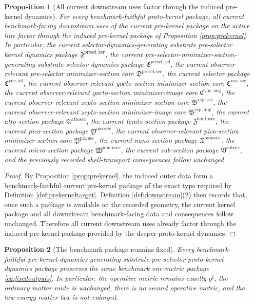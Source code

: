 \documentclass[11pt]{article}
\newcommand{\CompletedMetric}{g^{\sharp}}
\newcommand{\SubSectionPackage}{\mathfrak V^{\mathrm{subsec}}}
\newcommand{\MicroSectionPackage}{\mathfrak W^{\mathrm{microsec}}}
\newcommand{\NanoSectionPackage}{\mathfrak X^{\mathrm{nanosec}}}
\newcommand{\PicoSectionPackage}{\mathfrak Y^{\mathrm{picosec}}}
\newcommand{\PicoMinSectionCore}{\mathfrak Y^{\mathrm{pic,sec}}}
\newcommand{\FemtoSectionPackage}{\mathfrak Z^{\mathrm{femtosec}}}
\newcommand{\AttoSectionPackage}{\mathfrak A^{\mathrm{attosec}}}
\newcommand{\ZeptoImageCore}{\mathfrak B^{\mathrm{zep,img}}}
\newcommand{\ZeptoMinSectionCore}{\mathfrak B^{\mathrm{zep,sec}}}
\newcommand{\YoctoImageCore}{\mathfrak C^{\mathrm{yoc,img}}}
\newcommand{\YoctoMinSectionCore}{\mathfrak C^{\mathrm{yoc,sec}}}
\newcommand{\YoctoSelectorPackage}{\mathfrak C^{\mathrm{yoc,sel}}}
\newcommand{\PreSelectorMinSectionCore}{\mathfrak D^{\mathrm{presel,sec}}}
\newcommand{\PreSectionSelectorPackage}{\mathfrak E^{\mathrm{presel,sel}}}
\newcommand{\KernelPackage}{\mathfrak F^{\mathrm{presel,ker}}}
\newtheorem{proposition}{Proposition}
\begin{document}
\begin{proposition}[All current downstream uses factor through the induced pre-kernel dynamics]
\label{prop:downstream}
For every benchmark-faithful proto-kernel package, all current benchmark-facing downstream uses of the current pre-kernel package on the active line factor through the induced pre-kernel package of Proposition \ref{prop:prekernel}. In particular, the current selector-dynamics-generating substrate pre-selector kernel dynamics package \(\KernelPackage\), the current pre-selector-minimizer-section-generating substrate selector dynamics package \(\PreSectionSelectorPackage\), the current observer-relevant pre-selector minimizer-section core \(\PreSelectorMinSectionCore\), the current selector package \(\YoctoSelectorPackage\), the current observer-relevant yocto-section minimizer-section core \(\YoctoMinSectionCore\), the current observer-relevant yocto-section minimizer-image core \(\YoctoImageCore\), the current observer-relevant zepto-section minimizer-section core \(\ZeptoMinSectionCore\), the current observer-relevant zepto-section minimizer-image core \(\ZeptoImageCore\), the current atto-section package \(\AttoSectionPackage\), the current femto-section package \(\FemtoSectionPackage\), the current pico-section package \(\PicoSectionPackage\), the current observer-relevant pico-section minimizer-section core \(\PicoMinSectionCore\), the current nano-section package \(\NanoSectionPackage\), the current micro-section package \(\MicroSectionPackage\), the current sub-section package \(\SubSectionPackage\), and the previously recorded shell-transport consequences follow unchanged.
\end{proposition}

\begin{proof}
By Proposition \ref{prop:prekernel}, the induced outer data form a benchmark-faithful current pre-kernel package of the exact type required by Definition \ref{def:prekerneltarget}. Definition \ref{def:downstream}(2) then records that, once such a package is available on the recorded geometry, the current kernel package and all downstream benchmark-facing data and consequences follow unchanged. Therefore all current downstream uses already factor through the induced pre-kernel package provided by the deeper proto-kernel dynamics.
\end{proof}

\begin{proposition}[The benchmark package remains fixed]
\label{prop:benchmark}
Every benchmark-faithful pre-kernel-dynamics-generating substrate pre-selector proto-kernel dynamics package preserves the same benchmark one-metric package \eqref{eq:fixedoutputs}. In particular, the operative metric remains exactly \(\CompletedMetric\), the ordinary matter route is unchanged, there is no second operative metric, and the low-energy matter law is not enlarged.
\end{proposition}
\end{document}
